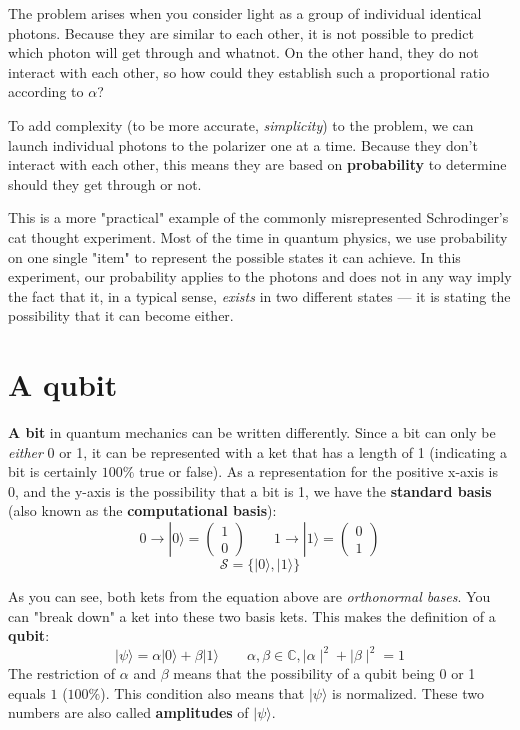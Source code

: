 The problem arises when you consider light as a group of individual identical photons. Because they are similar to each other, it is not possible to predict which photon will get through and whatnot. On the other hand, they do not interact with each other, so how could they establish such a proportional ratio according to $\alpha$?

To add complexity (to be more accurate, \textit{simplicity}) to the problem, we can launch individual photons to the polarizer one at a time. Because they don't interact with each other, this means they are based on \textbf{probability} to determine should they get through or not. 

This is a more "practical" example of the commonly misrepresented Schrodinger's cat thought experiment. Most of the time in quantum physics, we use probability on one single "item" to represent the possible states it can achieve. In this experiment, our probability applies to the photons and does not in any way imply the fact that it, in a typical sense, \textit{exists} in two different states — it is stating the possibility that it can become either.

\section{A qubit}
\textbf{A bit} in quantum mechanics can be written differently. Since a bit can only be \textit{either} 0 or 1, it can be represented with a ket that has a length of 1 (indicating a bit is certainly $100\%$ true or false). As a representation for the positive x-axis is 0, and the y-axis is the possibility that a bit is 1, we have the \textbf{standard basis} (also known as the \textbf{computational basis}):
\begin{equation}
    0 \rightarrow |0\rangle = \begin{pmatrix} 1 \\ 0\end{pmatrix}
    \qquad
    1 \rightarrow |1\rangle = \begin{pmatrix} 0 \\ 1\end{pmatrix}
\end{equation}
\begin{equation} \mathcal{S} = \{ |0\rangle, |1\rangle \} \end{equation}

As you can see, both kets from the equation above are \textit{orthonormal bases}. You can "break down" a ket into these two basis kets. This makes the definition of a \textbf{qubit}:
\begin{equation}
    |\psi\rangle 
    = \alpha|0\rangle + \beta|1\rangle
    \qquad
    \alpha,\beta\in\mathbb{C},
    \mid\alpha\mid^2 + \mid\beta\mid^2 = 1
\end{equation}
The restriction of $\alpha$ and $\beta$ means that the possibility of a qubit being 0 or 1 equals $1$ ($100\%$). This condition also means that $|\psi\rangle$ is normalized. These two numbers are also called \textbf{amplitudes} of $|\psi\rangle$.

